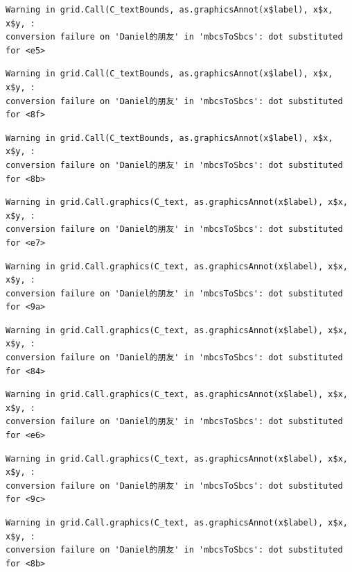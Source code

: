\documentclass[
  letterpaper,
  DIV=11,
  numbers=noendperiod]{scrreprt}
\begin{document}
\begin{verbatim}
Warning in grid.Call(C_textBounds, as.graphicsAnnot(x$label), x$x, x$y, :
conversion failure on 'Daniel的朋友' in 'mbcsToSbcs': dot substituted for <e5>
\end{verbatim}

\begin{verbatim}
Warning in grid.Call(C_textBounds, as.graphicsAnnot(x$label), x$x, x$y, :
conversion failure on 'Daniel的朋友' in 'mbcsToSbcs': dot substituted for <8f>
\end{verbatim}

\begin{verbatim}
Warning in grid.Call(C_textBounds, as.graphicsAnnot(x$label), x$x, x$y, :
conversion failure on 'Daniel的朋友' in 'mbcsToSbcs': dot substituted for <8b>
\end{verbatim}

\begin{verbatim}
Warning in grid.Call.graphics(C_text, as.graphicsAnnot(x$label), x$x, x$y, :
conversion failure on 'Daniel的朋友' in 'mbcsToSbcs': dot substituted for <e7>
\end{verbatim}

\begin{verbatim}
Warning in grid.Call.graphics(C_text, as.graphicsAnnot(x$label), x$x, x$y, :
conversion failure on 'Daniel的朋友' in 'mbcsToSbcs': dot substituted for <9a>
\end{verbatim}

\begin{verbatim}
Warning in grid.Call.graphics(C_text, as.graphicsAnnot(x$label), x$x, x$y, :
conversion failure on 'Daniel的朋友' in 'mbcsToSbcs': dot substituted for <84>
\end{verbatim}

\begin{verbatim}
Warning in grid.Call.graphics(C_text, as.graphicsAnnot(x$label), x$x, x$y, :
conversion failure on 'Daniel的朋友' in 'mbcsToSbcs': dot substituted for <e6>
\end{verbatim}

\begin{verbatim}
Warning in grid.Call.graphics(C_text, as.graphicsAnnot(x$label), x$x, x$y, :
conversion failure on 'Daniel的朋友' in 'mbcsToSbcs': dot substituted for <9c>
\end{verbatim}

\begin{verbatim}
Warning in grid.Call.graphics(C_text, as.graphicsAnnot(x$label), x$x, x$y, :
conversion failure on 'Daniel的朋友' in 'mbcsToSbcs': dot substituted for <8b>
\end{verbatim}
\end{document}
